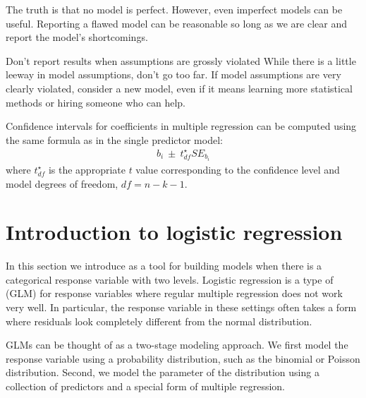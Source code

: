 \begin{tipBox}{
The truth is that no model is perfect. However, even imperfect models can be useful. Reporting a flawed model can be reasonable so long as we are clear and report the model's shortcomings.}
\end{tipBox}

\begin{caution}
{Don't report results when assumptions are grossly violated}
{While there is a little leeway in model assumptions, don't go too far. If model assumptions are very clearly violated, consider a new model, even if it means learning more statistical methods or hiring someone who can help.}
\end{caution}

\begin{tipBox}{
Confidence intervals for coefficients in multiple regression can be computed using the same formula as in the single predictor model:
\begin{align*}
b_i \ \pm\ t_{df}^{\star}SE_{b_{i}}
\end{align*}
where $t_{df}^{\star}$ is the appropriate $t$ value corresponding to the confidence level and model degrees of freedom, $df=n-k-1$.}
\end{tipBox}


\section[Introduction to logistic regression]{Introduction to logistic regression }
\label{logisticRegression}


In this section we introduce  as a tool for building models when there is a categorical response variable with two levels. Logistic regression is a type of  (GLM) for response variables where regular multiple regression does not work very well. In particular, the response variable in these settings often takes a form where residuals look completely different from the normal distribution.

GLMs can be thought of as a two-stage modeling approach. We first model the response variable using a probability distribution, such as the binomial or Poisson distribution. Second, we model the parameter of the distribution using a collection of predictors and a special form of multiple regression.

